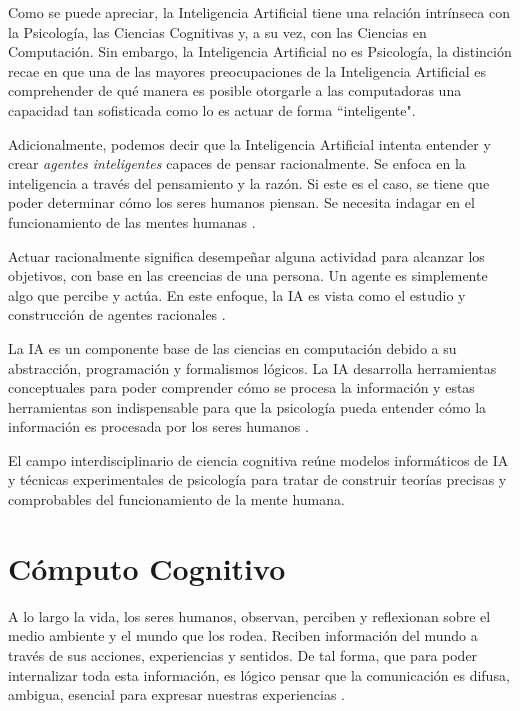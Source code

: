 Como se puede apreciar, la Inteligencia Artificial tiene una relaci\'{o}n intr\'{i}nseca con la Psicolog\'{i}a, las Ciencias Cognitivas y, a su vez, con las Ciencias en Computaci\'{o}n. Sin embargo, la Inteligencia Artificial no es Psicolog\'{i}a, la distinci\'{o}n recae en que una de las mayores preocupaciones de la Inteligencia Artificial es comprehender de qu\'{e} manera es posible otorgarle a las computadoras una capacidad tan sofisticada como lo es actuar de forma “inteligente".

Adicionalmente, podemos decir que la Inteligencia Artificial intenta entender y crear \emph{agentes inteligentes} capaces de pensar racionalmente. Se enfoca en la inteligencia a trav\'{e}s del pensamiento y la raz\'{o}n. Si este es el caso, se tiene que poder determinar c\'{o}mo los seres humanos piensan. Se necesita indagar en el funcionamiento de las mentes humanas \cite{brooks1995intelligence}.

Actuar racionalmente significa desempe\~nar alguna actividad para alcanzar los objetivos, con base en las creencias de una persona. Un agente es simplemente algo que percibe y actúa. En este enfoque, la IA es vista como el estudio y construcción de agentes racionales \cite{aimodern}.

La IA es un componente base de las ciencias en computaci\'{o}n debido a su abstracción, programación y formalismos lógicos. La IA  desarrolla  herramientas conceptuales para poder comprender c\'{o}mo se procesa la información y estas herramientas son indispensable para que la psicología pueda entender cómo la información es procesada por los seres humanos \cite{nilsson2014principles}.

El campo interdisciplinario de ciencia cognitiva reúne modelos informáticos de IA y técnicas experimentales de
psicología para tratar de construir teorías precisas y comprobables del funcionamiento de la mente humana.

\section{C\'{o}mputo Cognitivo}

A lo largo la vida, los seres humanos, observan, perciben y reflexionan sobre el medio ambiente y el mundo que los rodea. Reciben informaci\'{o}n del mundo a trav\'{e}s de sus acciones, experiencias y sentidos. De tal forma, que para poder internalizar toda esta informaci\'{o}n, es l\'{o}gico pensar que la comunicaci\'{o}n es difusa, ambigua, esencial para expresar nuestras experiencias \cite{langley2006intelligent}. 


